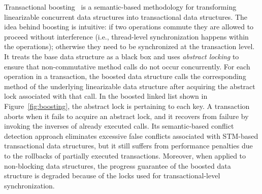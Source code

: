 \documentclass[]{sig-alternate-05-2015}
\begin{document}
Transactional boosting~\cite{herlihy2008transactional} is a semantic-based methodology for transforming linearizable concurrent data structures into transactional data structures.
The idea behind boosting is intuitive: if two operations commute they are allowed to proceed without interference (i.e., thread-level synchronization happens within the operations); otherwise they need to be synchronized at the transaction level.
It treats the base data structure as a black box and uses \emph{abstract locking} to ensure that non-commutative method calls do not occur concurrently. 
For each operation in a transaction, the boosted data structure calls the corresponding method of the underlying linearizable data structure after acquiring the abstract lock associated with that call. 
In the boosted linked list shown in Figure~\ref{fig:boosting}, the abstract lock is pertaining to each key.  
A transaction aborts when it fails to acquire an abstract lock, and it recovers from failure by invoking the inverses of already executed calls. 
Its semantic-based conflict detection approach eliminates excessive false conflicts associated with STM-based transactional data structures, but it still suffers from performance penalties due to the rollbacks of partially executed transactions.
Moreover, when applied to non-blocking data structures, the progress guarantee of the boosted data structure is degraded because of the locks used for transactional-level synchronization.
\end{document}
